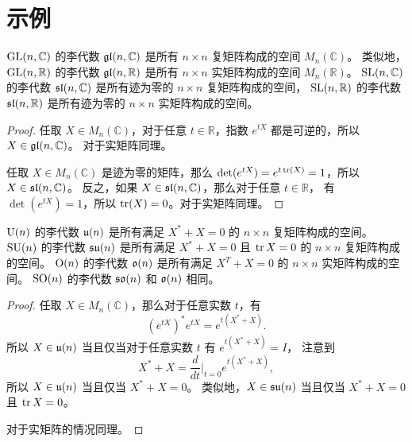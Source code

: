 \section{示例}

\begin{proposition}
  $\operatorname{GL}(n,\mathbb{C})$ 的李代数 $\mathfrak{gl}(n,\mathbb{C})$ 是所有 $n\times n$ 复矩阵构成的空间 $M_n(\mathbb{C})$。
  类似地，$\operatorname{GL}(n,\mathbb{R})$ 的李代数 $\mathfrak{gl}(n,\mathbb{R})$ 是所有 $n\times n$ 实矩阵构成的空间 $M_n(\mathbb{R})$。
  $\operatorname{SL}(n,\mathbb{C})$ 的李代数 $\mathfrak{sl}(n,\mathbb{C})$ 是所有迹为零的 $n\times n$ 复矩阵构成的空间，
  $\operatorname{SL}(n,\mathbb{R})$ 的李代数 $\mathfrak{sl}(n,\mathbb{R})$ 是所有迹为零的 $n\times n$ 实矩阵构成的空间。
\end{proposition}
\begin{proof}
  任取 $X\in M_n(\mathbb{C})$，对于任意 $t\in \mathbb{R}$，指数 $e^{tX}$
  都是可逆的，所以 $X\in \mathfrak{gl}(n,\mathbb{C})$。
  对于实矩阵同理。
  
  任取 $X\in M_n(\mathbb{C})$ 是迹为零的矩阵，那么
  $\det(e^{tX})=e^{t\operatorname{tr}(X)}=1$，所以 $X\in \mathfrak{sl}(n,\mathbb{C})$。
  反之，如果 $X\in \mathfrak{sl}(n,\mathbb{C})$，那么对于任意 $t\in\mathbb{R}$，
  有 $\det(e^{tX})=1$，所以 $\operatorname{tr}(X)=0$。对于实矩阵同理。
\end{proof}

\begin{proposition}
  $\operatorname{U}(n)$ 的李代数 $\mathfrak{u}(n)$ 是所有满足 $X^*+X=0$ 的 $n\times n$ 复矩阵构成的空间。
  $\operatorname{SU}(n)$ 的李代数 $\mathfrak{su}(n)$ 是所有满足 $X^*+X=0$ 且 $\operatorname{tr} X=0$ 的 $n\times n$ 复矩阵构成的空间。
  $\operatorname{O}(n)$ 的李代数 $\mathfrak{o}(n)$ 是所有满足 $X^T+X=0$ 的 $n\times n$ 实矩阵构成的空间。
  $\operatorname{SO}(n)$ 的李代数 $\mathfrak{so}(n)$ 和 $\mathfrak{o}(n)$ 相同。
\end{proposition}
\begin{proof}
  任取 $X\in M_n(\mathbb{C})$，那么对于任意实数 $t$，有
  \[
    (e^{tX})^*e^{tX}=e^{t(X^*+X)}.
  \]
  所以 $X\in \mathfrak{u}(n)$ 当且仅当对于任意实数 $t$ 有 $e^{t(X^*+X)}=I$，
  注意到
  \[
    X^*+X=\frac{d}{dt}\bigg|_{t=0}e^{t(X^*+X)},
  \]
  所以 $X\in \mathfrak{u}(n)$ 当且仅当 $X^*+X=0$。
  类似地，$X\in \mathfrak{su}(n)$ 当且仅当 $X^*+X=0$ 且 $\operatorname{tr} X=0$。

  对于实矩阵的情况同理。
\end{proof}

